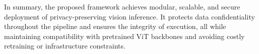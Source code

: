 \documentclass{ieeeaccess}
\begin{document}
In summary, the proposed framework achieves modular, scalable, and secure deployment of privacy-preserving vision inference. It protects data confidentiality throughout the pipeline and ensures the integrity of execution, all while maintaining compatibility with pretrained ViT backbones and avoiding costly retraining or infrastructure constraints.




\end{document}
